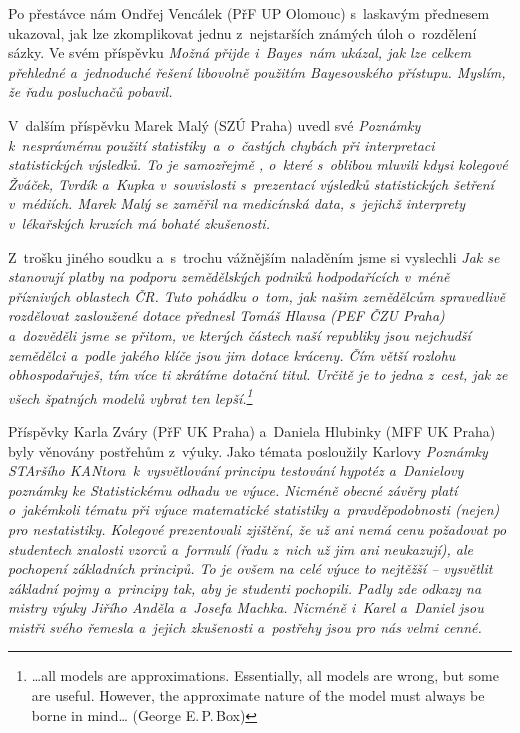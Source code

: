 Po přestávce nám Ondřej Vencálek (PřF UP Olomouc) s~laskavým před\-ne\-sem ukazoval, jak lze zkomplikovat jednu z~nejstarších známých úloh o~roz\-dě\-le\-ní sázky. Ve svém příspěvku \em Možná přijde i~Bayes\em\ nám ukázal, jak lze celkem přehledné a~jednoduché řešení libovolně  použitím Bayesovského přístupu. Myslím, že řadu posluchačů pobavil.

V~dalším příspěvku Marek Malý (SZÚ Praha) uvedl své \em Poznámky k~nesprávnému použití statistiky\em\ a~o~častých chybách při interpretaci statistických výsledků. To je samozřejmě , o~které s~oblibou mluvili kdysi kolegové Žváček, Tvrdík a~Kupka v~souvislosti s~prezentací výsledků statistických šetření v~médiích. Marek Malý se zaměřil na medicínská data, s~jejichž interprety v~lékařských kruzích má bohaté zkušenosti.

Z~trošku jiného soudku a~s~trochu vážnějším naladěním jsme si vyslechli \em Jak se stanovují platby na podporu zemědělských podniků hodpodařících v~mé\-ně příznivých oblastech ČR\em.  Tuto pohádku o~tom, jak našim zemědělcům spravedlivě rozdělovat zasloužené dotace přednesl Tomáš Hlavsa (PEF ČZU Praha) a~dozvěděli jsme se přitom, ve kterých částech naší republiky jsou nejchudší zemědělci a~podle jakého klíče jsou jim dotace kráceny. Čím větší rozlohu obhospodařuješ, tím více ti zkrátíme dotační titul. Určitě je to jedna z~cest, jak ze všech špatných modelů vybrat ten lepší.\footnote{\ldots{}all models are approximations. Essentially, all models are wrong, but some are useful. However, the approximate nature of the model must always be borne in mind\ldots{} (George E.\,P.\,Box)}
 
Příspěvky Karla Zváry (PřF UK Praha) a~Daniela Hlubinky (MFF UK Praha) byly věnovány postřehům z~výuky. Jako témata posloužily Karlovy \em Poznámky STAršího KANtora\em\ k~vysvětlování principu testování hypotéz a~Danielovy poznámky ke \em Statistickému odhadu ve výuce\em. Nicméně obecné závěry platí o~jakémkoli tématu při výuce matematické statistiky a~prav\-dě\-po\-dob\-nos\-ti (nejen) pro nestatistiky. Kolegové prezentovali zjištění, že už ani nemá cenu požadovat po studentech znalosti vzorců a~formulí (řadu z~nich už jim ani neukazují), ale pochopení základních principů. To je ovšem na celé výuce to nejtěžší -- vysvětlit základní pojmy a~principy tak, aby je studenti pochopili. Padly zde odkazy na mistry výuky Jiřího Anděla a~Josefa Machka. Nicméně i~Karel a~Daniel jsou mistři svého řemesla a~jejich zkušenosti a~postřehy jsou pro nás velmi cenné.   

